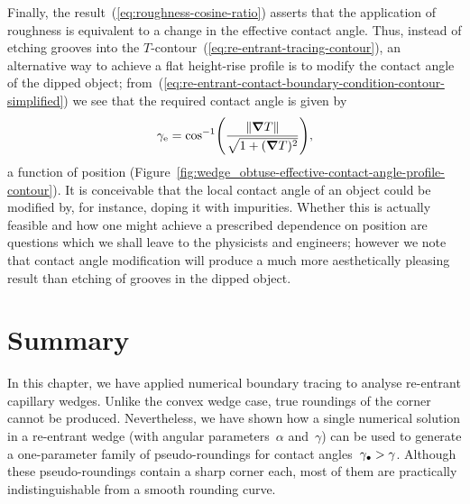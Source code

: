 Finally, the result~(\ref{eq:roughness-cosine-ratio})
asserts that the application of roughness
is equivalent to a change in the effective contact angle.
Thus, instead of etching grooves
into the $T$-contour~(\ref{eq:re-entrant-tracing-contour}),
an alternative way to achieve a flat height-rise profile
is to modify the contact angle of the dipped object;
from~(\ref{eq:re-entrant-contact-boundary-condition-contour-simplified})
we see that the required contact angle is given by
\begin{equation}
  \gamma_\eff =
    \cos^{-1} \roundbr*{\frac{\norm{\del T}}{\sqrt{1 + (\del T)^2}}},
  \label{eq:effective-contact-angle-required}
\end{equation}
a function of position
(Figure~\ref{fig:wedge_obtuse-effective-contact-angle-profile-contour}).
It is conceivable that
the local contact angle of an object could be modified
by, for instance, doping it with impurities.
Whether this is actually feasible
and how one might achieve a prescribed dependence on position
are questions which we shall leave to the physicists and engineers;
however we note that contact angle modification
will produce a much more aesthetically pleasing result
than etching of grooves in the dipped object.

\begin{figure}
\end{figure}

\section{Summary}
\label{sec:re-entrant.summary}

In this chapter, we have applied numerical boundary tracing
to analyse re-entrant capillary wedges.
Unlike the convex wedge case,
true roundings of the corner cannot be produced.
Nevertheless, we have shown how
a single numerical solution in a re-entrant wedge
(with angular parameters~$\alpha$ and~$\gamma$)
can be used to generate a one-parameter family
of pseudo-roundings for contact angles~$\gamma_\bullet > \gamma$.
Although these pseudo-roundings contain a sharp corner each,
most of them are practically indistinguishable from a smooth rounding curve.

